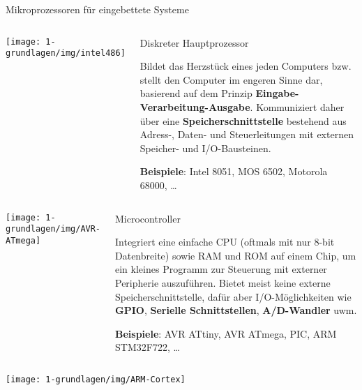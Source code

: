 {
\footnotesize

\begin{frame}{Mikroprozessoren für eingebettete Systeme}
    \begin{columns}
        \texttt{[image: 1-grundlagen/img/intel486]}

        \begin{block}{Diskreter Hauptprozessor}
            \parbox{\linewidth}{
                \smallskip

                Bildet das Herzstück eines jeden Computers bzw. stellt den Computer
                im engeren Sinne dar, basierend auf dem Prinzip
                \textbf{Eingabe-Verarbeitung-Ausgabe}. Kommuniziert daher über eine
                \textbf{Speicherschnittstelle} bestehend aus Adress-, Daten- und Steuerleitungen
                mit externen Speicher- und I/O-Bausteinen.
            }

            \smallskip

            \textbf{Beispiele}: Intel 8051, MOS 6502, Motorola 68000, …
        \end{block}
    \end{columns}

    \begin{columns}
        \texttt{[image: 1-grundlagen/img/AVR-ATmega]}

        \begin{block}{Microcontroller}
            \parbox{\linewidth}{
                \smallskip

                Integriert eine einfache CPU (oftmals mit nur 8-bit Datenbreite)
                sowie RAM und ROM auf einem Chip, um ein kleines Programm zur
                Steuerung mit externer Peripherie auszuführen. Bietet meist keine
                externe Speicherschnittstelle, dafür aber I/O-Möglichkeiten wie
                \textbf{GPIO}, \textbf{Serielle Schnittstellen}, \textbf{A/D-Wandler}
                uwm.
            }

            \smallskip

            \textbf{Beispiele}: AVR ATtiny, AVR ATmega, PIC, ARM STM32F722, …
        \end{block}
    \end{columns}

    \begin{columns}
        \texttt{[image: 1-grundlagen/img/ARM-Cortex]}


\end{columns}
\end{frame}}
